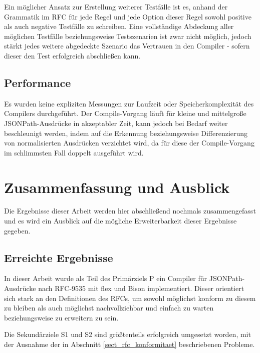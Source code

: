 \documentclass[oneside]{ausarbeitung}
\begin{document}
	Ein möglicher Ansatz zur Erstellung weiterer Testfälle ist es, anhand der Grammatik im RFC für jede Regel und jede Option dieser Regel sowohl positive als auch negative Testfälle zu schreiben. Eine vollständige Abdeckung aller möglichen Testfälle beziehungsweise Testszenarien ist zwar nicht möglich, jedoch stärkt jedes weitere abgedeckte Szenario das Vertrauen in den Compiler - sofern dieser den Test erfolgreich abschließen kann.
	
	
	
	\section{Performance}
	\label{sect_performance}
	
	Es wurden keine expliziten Messungen zur Laufzeit oder Speicherkomplexität des Compilers durchgeführt. Der Compile-Vorgang läuft für kleine und mittelgroße JSONPath-Ausdrücke in akzeptabler Zeit, kann jedoch bei Bedarf weiter beschleunigt werden, indem auf die Erkennung beziehungsweise Differenzierung von normalisierten Ausdrücken verzichtet wird, da für diese der Compile-Vorgang im schlimmsten Fall doppelt ausgeführt wird. 








\chapter{Zusammenfassung und Ausblick}
\label{cha:zusammenfassung}

Die Ergebnisse dieser Arbeit werden hier abschließend nochmals zusammengefasst und es wird ein Ausblick auf die mögliche Erweiterbarkeit dieser Ergebnisse gegeben.

\section{Erreichte Ergebnisse}
\label{sec:ergebnisse}

In dieser Arbeit wurde als Teil des Primärziels P ein Compiler für JSONPath-Ausdrücke nach RFC-9535 mit flex und Bison implementiert. Dieser orientiert sich stark an den Definitionen des RFCs, um sowohl möglichst konform zu diesem zu bleiben als auch möglichst nachvollziehbar und einfach zu warten beziehungsweise zu erweitern zu sein.

Die Sekundärziele S1 und S2 sind größtenteils erfolgreich umgesetzt worden, mit der Ausnahme der in Abschnitt \ref{sect_rfc_konformitaet} beschriebenen Probleme.
\end{document}
